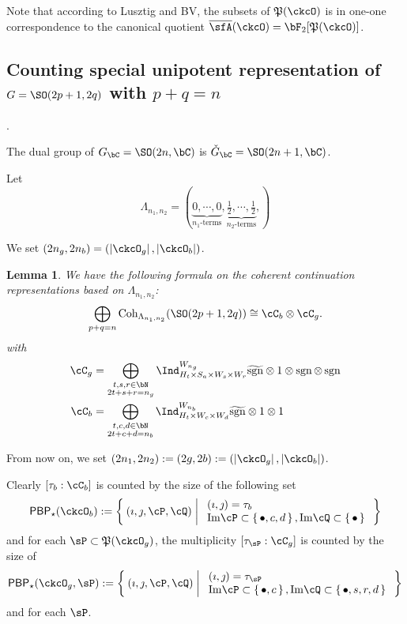 \documentclass[12pt,a4paper]{amsart}
\def\Im{\operatorname{Im}}
\def\abs#1{\left|{#1}\right|}
\newcommand{\CQ}{{\mathcal {Q}}}
\newcommand{\sgn}{\operatorname{sgn}}
\numberwithin{equation}{section}
\newtheorem{lem}[thm]{Lemma}
\theoremstyle{remark}
\def\half{{\tfrac{1}{2}}}
\def\ckGc{\check{G}_{\bC}}
\def\Cint#1{\Coh_{[#1]}}
\def\Gc{G_\bC}
\def\Im{\mathrm{Im}}
\def\Coh{\mathrm{Coh}}
\def\CQ{\overline{\sfA}}%
\def\CPP{\mathfrak{P}}
\def\hsgn{\widetilde{\mathrm{sgn}}}
\begin{document}
{Note that according to Lusztig and BV, the subsets of $\CPP(\ckcO)$ is in
one-one correspondence to the canonical quotient $\CQ(\ckcO) = \bF_{2}[\CPP(\ckcO)]$.
}

\subsection{Counting special unipotent representation of $G=\SO(2p+1,2q)$ with
$p+q=n$}.

The dual group of $\Gc = \SO(2n,\bC)$ is $\ckGc = \SO(2n+1,\bC)$.

Let \[
  \Lambda_{n_{1}, n_{2}} = (\underbrace{0,\cdots,0}_{n_{1}\text{-terms}}, \underbrace{\half,\cdots,\half}_{n_{2}\text{-terms}}, )
\]

We set $(2n_{g},2n_{b}) = (\abs{\ckcO_g},\abs{\ckcO_b})$.

\begin{lem}
  We have the following formula on the coherent continuation
  representations based on $\Lambda_{n_{1},n_{2}}$:
  \[
    \bigoplus_{p+q=n} \Coh_{\Lambda_{n_1, n_2}}(\SO(2p+1,2q)) \cong \cC_{b}\otimes \cC_{g}.
  \]
  with
  \[
    \begin{split}
      \cC_g %
      &=\bigoplus_{\substack{t,s,r\in\bN\\2t+s+r=n_{g}}} \Ind_{H_{t} \times S_{a}\times W_s\times W_r}^{W_{n_{g}}}
      \hsgn \otimes 1 \otimes \sgn \otimes \sgn \\
      \cC_b & =
      \bigoplus_{\substack{t,c,d\in \bN\\2t+c+d=n_{b}}}
      \Ind_{H_{t}\times W_{c}\times W_{d}}^{W_{n_{b}}} \hsgn\otimes 1\otimes 1
    \end{split}
  \]
\end{lem}


From now on, we set $ (2n_{1},2n_{2}) := (2g,2b) :=(\abs{\ckcO_g},\abs{\ckcO_b})$.

Clearly $[\tau_{b}:\cC_{b}]$ is counted by the size of the following set
\[
  \PBP_{\star}(\ckcO_b) := \Set{(\imath,\jmath,\cP,\cQ)| %
    \begin{array}{l}
      (\imath,\jmath) = \tau_{b}\\
      \Im \cP \subset \set{\bullet,c,d}, \Im \cQ \subset\set{\bullet}\\
    \end{array}
  }
\]
and for each $\sP\subset \CPP(\ckcO_{g})$, the multiplicity
$[\tau_{\sP}: \cC_{g}]$ is counted by the size of
\[
  \PBP_{\star}(\ckcO_g,\sP):= \Set{(\imath,\jmath,\cP,\cQ)| %
    \begin{array}{l}
      (\imath,\jmath) = \tau_{\sP}\\
      \Im \cP \subset \set{\bullet,c}, \Im \cQ \subset\set{\bullet, s,r,d}\\
    \end{array}
  }
\]
and for each $\sP$.
\end{document}
